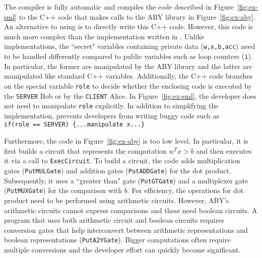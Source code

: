The \tool compiler is fully automatic and compiles the code described in Figure~\ref{fig:ex-sml} to the C++ code that makes calls to the ABY library  in
Figure~\ref{fig:ex-aby}. An alternative to using \tool is to directly write this C++ code.
However, this code is much more complex than the implementation written in \tool.
Unlike \tool implementations, the ``secret" variables containing private data ({\tt w,x,b,acc}) need to be handled differently compared to public variables such as loop counters ({\tt i}). In particular, the former are manipulated by the ABY library and the latter are manipulated like standard  C++ variables.
Additionally, the C++ code branches on  the special variable
{\tt role}  to decide whether the enclosing code is executed by the {\tt SERVER} Bob or by
the {\tt CLIENT} Alice. In Figure~\ref{fig:ex-sml}, the developer does not need to
manipulate {\tt role} explicitly. In addition to simplifying the implementation, \tool prevents developers from writing buggy code such as\\
\verb+if(role == SERVER) {...manipulate x...}+

Furthermore, the code in Figure~\ref{fig:ex-aby} is too low level.
In particular, it is first builds a circuit that represents the computation
$w^Tx>b$ and then executes it via a call to {\tt ExecCircuit}.
To build a circuit, the code adds multiplication gates ({\tt PutMULGate})
and addition gates ({\tt PutADDGate}) for the dot product.
Subsequently, it uses a ``greater than" gate ({\tt PutGTGate})
and a multiplexer gate ({\tt PutMUXGate}) for the comparison with $b$.
For efficiency, the operations for dot product need to be performed using 
arithmetic circuits. However, ABY's arithmetic circuits cannot express
comparisons and these need  boolean circuits.
A program that uses both arithmetic circuit and boolean circuits
requires conversion gates that help  interconvert between arithmetic
representations and boolean representations ({\tt PutA2YGate}).
Bigger computations often require multiple conversions and the
developer effort can quickly become significant.

